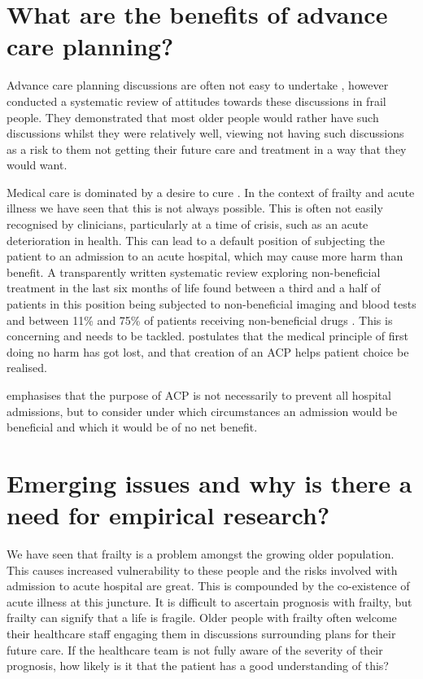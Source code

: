 \documentclass
[
	12pt,
	a4paper,
	oneside,
]{report}
\begin{document}
\section{What are the benefits of advance care planning?}

Advance care planning discussions are often not easy to undertake 
\parencite{taylor:17}, however \textcite{sharp:13} conducted a systematic
review of attitudes towards these discussions in frail people. They 
demonstrated that most older people would rather have such discussions
whilst they were relatively well, viewing not having such discussions
as a risk to them not getting their future care and treatment in a way
that they would want.

Medical care is dominated by a desire to cure \parencite{taylor:17}. In the 
context of frailty and acute illness we have seen that this is not always 
possible. This is often not easily recognised by clinicians, particularly
at a time of crisis, such as an acute deterioration in health. This can lead
to a default position of subjecting the patient to an admission to an acute
hospital, which may cause more harm than benefit. A transparently written 
systematic review exploring non-beneficial treatment in the last six months
of life found between a third and a half of patients in this position being
subjected to non-beneficial imaging and blood tests and between 11\% and
75\% of patients receiving non-beneficial drugs \parencite{cardona:16}.
This is concerning and needs to be tackled. \textcite{taylor:17} postulates
that the medical principle of first doing no harm has got lost, and that
creation of an ACP helps patient choice be realised.

\textcite{waird:16} emphasises that the purpose of ACP is not necessarily
to prevent all hospital admissions, but to consider under which 
circumstances an admission would be beneficial and which it would be of
no net benefit.

\section{Emerging issues and why is there a need for empirical 
research?}

We have seen that frailty is a problem amongst the growing older population.
This causes increased vulnerability to these people and the risks involved with 
admission to acute hospital are great. This is compounded by the co-existence
of acute illness at this juncture. It is difficult to ascertain prognosis with 
frailty, but frailty can signify that a life is fragile. Older people with 
frailty often welcome their healthcare staff engaging them in discussions 
surrounding plans for their future care. If the healthcare team is not fully
aware of the severity of their prognosis, how likely is it that the patient
has a good understanding of this? 
\end{document}

